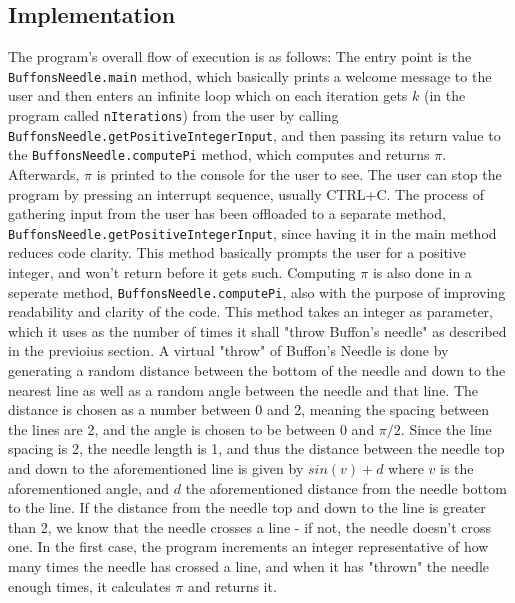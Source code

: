 \documentclass{scrartcl}
\newcommand\code[1]{\texttt{#1}}
\begin{document}
\subsection*{Implementation}
The program's overall flow of execution is as follows:
The entry point is the \code{BuffonsNeedle.main} method, which
basically prints a welcome message to the user and then enters an
infinite loop which on each iteration gets $k$ (in the program
called \code{nIterations}) from the user by calling
\code{BuffonsNeedle.getPositiveIntegerInput}, and then passing
its return value to the \code{BuffonsNeedle.computePi} method, which
computes and returns $\pi$.  Afterwards, $\pi$  is printed to the
console for the user to see. The user can stop the program by pressing
an interrupt sequence, usually CTRL+C.
The process of gathering input from the user has been offloaded to a
separate method, \code{BuffonsNeedle.getPositiveIntegerInput}, since
having it in the main method reduces code clarity. This method
basically prompts the user for a positive integer, and won't return
before it gets such.
Computing $\pi$  is also done in a seperate method, \code{BuffonsNeedle.computePi},
also with the purpose of improving readability and clarity of the code.
This method takes an integer as parameter, which it uses as the number of times it shall
"throw Buffon's needle" as described in the previoius section. A virtual
"throw" of Buffon's Needle is done by generating a random distance between the bottom
of the needle and down to the nearest line as well as a random angle between the
needle and that line. The distance is chosen as a number between 0 and 2, meaning the
spacing between the lines are 2, and the angle is chosen to be between 0 and $\pi/2$.
Since the line spacing is 2, the needle length is 1, and thus the distance between
the needle top and down to the aforementioned line is given by $sin(v)+d$ where $v$ is the
aforementioned angle, and $d$ the aforementioned distance from the needle bottom to the line.
If the distance from the needle top and down to the line is greater than 2,
we know that the needle crosses a line - if not, the needle doesn't cross one.
In the first case, the program increments an integer representative of how many
times the needle has crossed a line, and when it has "thrown" the needle
enough times, it calculates $\pi$  and returns it.
\end{document}
